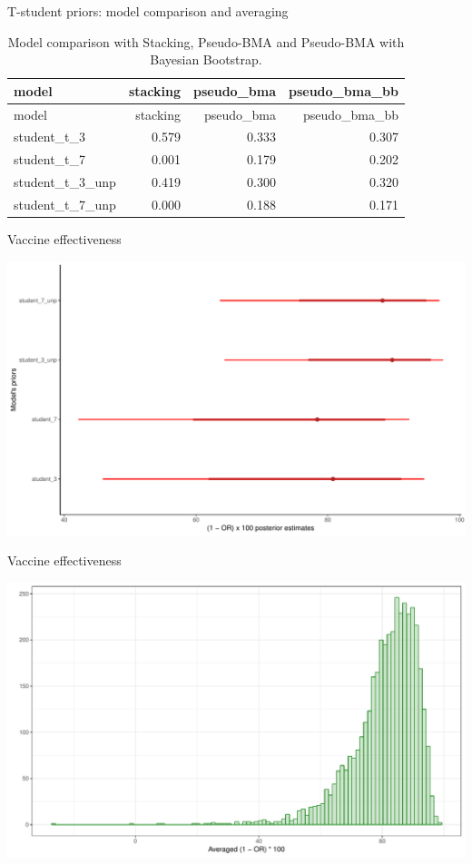 \documentclass[ignorenonframetext,a4paper]{beamer}
\begin{document}
\begin{frame}{T-student priors: model comparison and averaging}

\begin{longtable}[]{@{}lrrr@{}}
\caption{Model comparison with Stacking, Pseudo-BMA and Pseudo-BMA with
Bayesian Bootstrap.}\tabularnewline
\toprule
model & stacking & pseudo\_bma & pseudo\_bma\_bb\tabularnewline
\midrule
\endfirsthead
\toprule
model & stacking & pseudo\_bma & pseudo\_bma\_bb\tabularnewline
\midrule
\endhead
student\_t\_3 & 0.579 & 0.333 & 0.307\tabularnewline
student\_t\_7 & 0.001 & 0.179 & 0.202\tabularnewline
student\_t\_3\_unp & 0.419 & 0.300 & 0.320\tabularnewline
student\_t\_7\_unp & 0.000 & 0.188 & 0.171\tabularnewline
\bottomrule
\end{longtable}

\end{frame}

\begin{frame}{Vaccine effectiveness}

\includegraphics{DB_presentation_case_study_files/figure-beamer/unnamed-chunk-38-1.pdf}

\end{frame}

\begin{frame}{Vaccine effectiveness}

\includegraphics{DB_presentation_case_study_files/figure-beamer/unnamed-chunk-39-1.pdf}

\end{frame}
\end{document}
